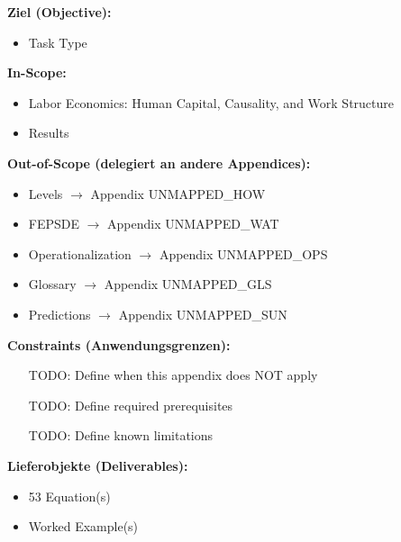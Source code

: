 
\begin{tcolorbox}[
    colback=orange!5!white,
    colframe=orange!75!black,
    title={\textbf{Appendix Scope: Ziel / In-Scope / Out-of-Scope / Constraints}},
    fonttitle=\bfseries
]

\textbf{Ziel (Objective):}
\begin{itemize}[nosep]
    \item Task Type
\end{itemize}

\textbf{In-Scope:}
\begin{itemize}[nosep]
    \item Labor Economics: Human Capital, Causality, and Work Structure
    \item Results
\end{itemize}

\textbf{Out-of-Scope (delegiert an andere Appendices):}
\begin{itemize}[nosep]
    \item Levels $\rightarrow$ Appendix UNMAPPED_HOW
    \item FEPSDE $\rightarrow$ Appendix UNMAPPED_WAT
    \item Operationalization $\rightarrow$ Appendix UNMAPPED_OPS
    \item Glossary $\rightarrow$ Appendix UNMAPPED_GLS
    \item Predictions $\rightarrow$ Appendix UNMAPPED_SUN
\end{itemize}

\textbf{Constraints (Anwendungsgrenzen):}
\begin{itemize}[nosep]
    \item [TODO: Define when this appendix does NOT apply]
    \item [TODO: Define required prerequisites]
    \item [TODO: Define known limitations]
\end{itemize}

\textbf{Lieferobjekte (Deliverables):}
\begin{itemize}[nosep]
    \item 53 Equation(s)
    \item Worked Example(s)
\end{itemize}

\end{tcolorbox}


